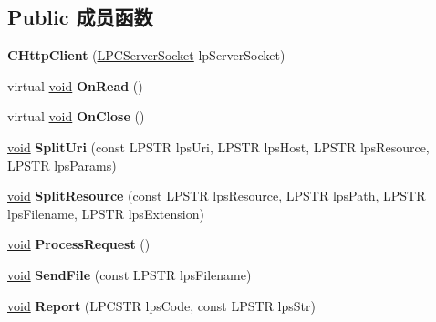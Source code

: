 \subsection*{Public 成员函数}
\begin{DoxyCompactItemize}
\item 
\mbox{\label{class_c_http_client_ae81a4071160f75d652ce32286400740f}} 
{\bfseries C\+Http\+Client} (\hyperlink{class_c_server_socket}{L\+P\+C\+Server\+Socket} lp\+Server\+Socket)
\item 
\mbox{\label{class_c_http_client_a956b626a3f66b5a1b2ab02fd7c27ab3a}} 
virtual \hyperlink{interfacevoid}{void} {\bfseries On\+Read} ()
\item 
\mbox{\label{class_c_http_client_a43781f900d1212b4740ded2a6ee99289}} 
virtual \hyperlink{interfacevoid}{void} {\bfseries On\+Close} ()
\item 
\mbox{\label{class_c_http_client_a6b2d802a5c01e2d40abf988679836a94}} 
\hyperlink{interfacevoid}{void} {\bfseries Split\+Uri} (const L\+P\+S\+TR lps\+Uri, L\+P\+S\+TR lps\+Host, L\+P\+S\+TR lps\+Resource, L\+P\+S\+TR lps\+Params)
\item 
\mbox{\label{class_c_http_client_a831a008beccdecf043768b4f52882de9}} 
\hyperlink{interfacevoid}{void} {\bfseries Split\+Resource} (const L\+P\+S\+TR lps\+Resource, L\+P\+S\+TR lps\+Path, L\+P\+S\+TR lps\+Filename, L\+P\+S\+TR lps\+Extension)
\item 
\mbox{\label{class_c_http_client_a5d42baf9f70029e88ed5f8ac4cd1a2f0}} 
\hyperlink{interfacevoid}{void} {\bfseries Process\+Request} ()
\item 
\mbox{\label{class_c_http_client_af28242f8f18d629e967b31431104abea}} 
\hyperlink{interfacevoid}{void} {\bfseries Send\+File} (const L\+P\+S\+TR lps\+Filename)
\item 
\mbox{\label{class_c_http_client_ae3511f23bff00654d92a167a53f47298}} 
\hyperlink{interfacevoid}{void} {\bfseries Report} (L\+P\+C\+S\+TR lps\+Code, const L\+P\+S\+TR lps\+Str)
\end{DoxyCompactItemize}
